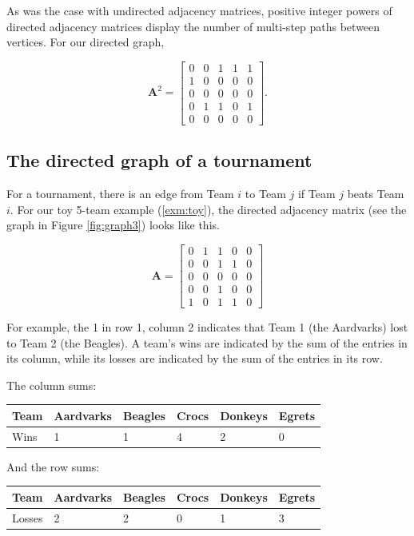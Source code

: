 \documentclass[
]{book}
\theoremstyle{definition}
\theoremstyle{definition}
\theoremstyle{definition}
\theoremstyle{definition}
\theoremstyle{remark}
\begin{document}
As was the case with undirected adjacency matrices, positive integer powers of directed adjacency matrices display the number of multi-step paths between vertices. For our directed graph,

\[\mathbf{A}^2=\begin{bmatrix}0 & 0 & 1 & 1 & 1\\1 & 0 & 0 & 0 & 0\\0 & 0 & 0 & 0 & 0\\0 & 1 & 1 & 0 & 1\\0 & 0 & 0 & 0 & 0\end{bmatrix}.\]

\subsection*{The directed graph of a tournament}\label{the-directed-graph-of-a-tournament}

For a tournament, there is an edge from Team \(i\) to Team \(j\) if Team \(j\) beats Team \(i\). For our toy 5-team example (\ref{exm:toy}), the directed adjacency matrix (see the graph in Figure \ref{fig:graph3}) looks like this.

\[\mathbf{A}=\begin{bmatrix}
0 & 1 & 1 & 0 & 0\\
    0 & 0 & 1 & 1 & 0 \\
    0 & 0 & 0 & 0 & 0\\
    0 & 0 & 1 & 0 & 0\\
    1 & 0 & 1 & 1 & 0
\end{bmatrix}\]

For example, the 1 in row 1, column 2 indicates that Team 1 (the Aardvarks) lost to Team 2 (the Beagles). A team's wins are indicated by the sum of the entries in its column, while its losses are indicated by the sum of the entries in its row.

The column sums:

\begin{longtable}[]{@{}llllll@{}}
\toprule\noalign{}
Team & Aardvarks & Beagles & Crocs & Donkeys & Egrets \\
\midrule\noalign{}
\endhead
\bottomrule\noalign{}
\endlastfoot
Wins & 1 & 1 & 4 & 2 & 0 \\
\end{longtable}

And the row sums:

\begin{longtable}[]{@{}llllll@{}}
\toprule\noalign{}
Team & Aardvarks & Beagles & Crocs & Donkeys & Egrets \\
\midrule\noalign{}
\endhead
\bottomrule\noalign{}
\endlastfoot
Losses & 2 & 2 & 0 & 1 & 3 \\
\end{longtable}
\end{document}
